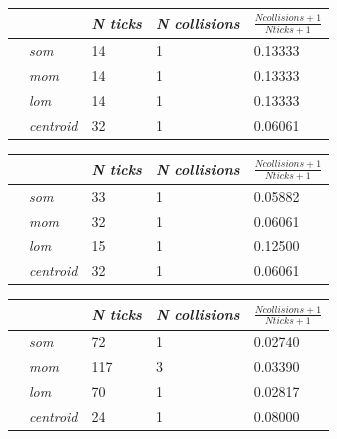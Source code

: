 \documentclass[conference]{IEEEtran}
\begin{document}
\begin{center}
\begin{tabular}{ | m{2.8em} | m{3em} | m{2.8em} | m{5em} | m{5.2em} | }
\hline
{} & \textit{N ticks} & \textit{N collisions} & $\frac{N collisions + 1}{N ticks + 1}$ \\
\hline
{} & \textit{som} & 14 & 1 & 0.13333 \\
 & \textit{mom} & 14 & 1 & 0.13333 \\
 & \textit{lom} & 14 & 1 & 0.13333 \\
 & \textit{centroid} & 32 & 1 & 0.06061 \\
\hline
\end{tabular}
\label{table:ps10e1amax}
\end{center}

\begin{center}
\begin{tabular}{ | m{2.8em} | m{3em} | m{2.8em} | m{5em} | m{5.2em} | }
\hline
{} & \textit{N ticks} & \textit{N collisions} & $\frac{N collisions + 1}{N ticks + 1}$ \\
\hline
{} & \textit{som} & 33 & 1 & 0.05882 \\
 & \textit{mom} & 32 & 1 & 0.06061 \\
 & \textit{lom} & 15 & 1 & 0.12500 \\
 & \textit{centroid} & 32 & 1 & 0.06061 \\
\hline
\end{tabular}
\label{table:ps10e1asum}
\end{center}


\begin{center}
\begin{tabular}{ | m{2.8em} | m{3em} | m{2.8em} | m{5em} | m{5.2em} | }
\hline
{} & \textit{N ticks} & \textit{N collisions} & $\frac{N collisions + 1}{N ticks + 1}$ \\
\hline
{} & \textit{som} & 72 & 1 & 0.02740 \\
 & \textit{mom} & 117 & 3 & 0.03390 \\
 & \textit{lom} & 70 & 1 & 0.02817 \\
 & \textit{centroid} & 24 & 1 & 0.08000 \\
\hline
\end{tabular}
\label{table:ps10e2amax}
\end{center}
\end{document}
